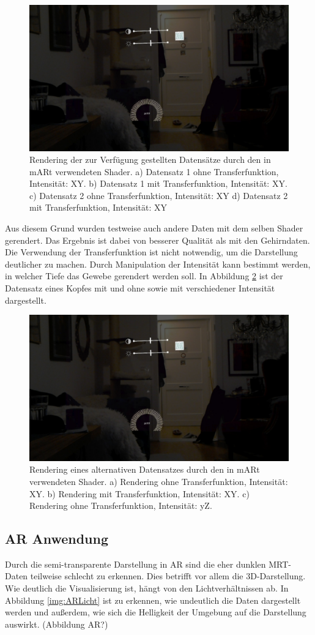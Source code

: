 \begin{figure}[!htb]
	\centering
	\includegraphics[width=0.5\linewidth]{images/hololens2D.jpg}
	\caption{Rendering der zur Verfügung gestellten Datensätze durch den in mARt verwendeten Shader. a) Datensatz 1 ohne Transferfunktion, Intensität: XY. b) Datensatz 1 mit Transferfunktion, Intensität: XY. c) Datensatz 2 ohne Transferfunktion, Intensität: XY d) Datensatz 2 mit Transferfunktion, Intensität: XY}
	\label{img:result}
\end{figure}
\FloatBarrier
  
Aus diesem Grund wurden testweise auch andere Daten mit dem selben Shader gerendert. Das Ergebnis ist dabei von besserer Qualität als mit den Gehirndaten. Die Verwendung der Transferfunktion ist nicht notwendig, um die Darstellung deutlicher zu machen. Durch Manipulation der Intensität kann bestimmt werden, in welcher Tiefe das Gewebe gerendert werden soll. In Abbildung \ref{img:resultsVisMale} ist der Datensatz eines Kopfes mit und ohne sowie mit verschiedener Intensität dargestellt.
  
\begin{figure}[!htb]
	\centering
	\includegraphics[width=0.5\linewidth]{images/hololens2D.jpg}
	\caption{Rendering eines alternativen Datensatzes durch den in mARt verwendeten Shader. a) Rendering ohne Transferfunktion, Intensität: XY. b) Rendering mit Transferfunktion, Intensität: XY. c) Rendering ohne Transferfunktion, Intensität: yZ.}
	\label{img:resultsVisMale}
\end{figure}
\FloatBarrier
  
\subsection{AR Anwendung}
Durch die semi-transparente Darstellung in AR sind die eher dunklen MRT-Daten teilweise schlecht zu erkennen. Dies betrifft vor allem die 3D-Darstellung. Wie deutlich die Visualisierung ist, hängt von den Lichtverhältnissen ab. In Abbildung \ref{img:ARLicht} ist zu erkennen, wie undeutlich die Daten dargestellt werden und außerdem, wie sich die Helligkeit der Umgebung auf die Darstellung auswirkt. (Abbildung AR?)

